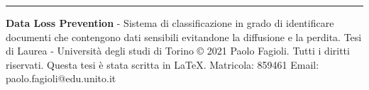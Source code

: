 
    \vspace*{\fill}
    \noindent\rule{\textwidth}{0.4pt}
    \thispagestyle{empty}
    \textbf{Data Loss Prevention} - Sistema di classificazione in grado di identificare documenti che contengono dati sensibili evitandone la diffusione e la perdita.
    \newline
    \newline
    Tesi di Laurea - Università degli studi di Torino
    \newline
    © 2021 Paolo Fagioli. Tutti i diritti riservati.
    \newline
    \newline
    Questa tesi è stata scritta in \LaTeX.
    \newline
    \newline
    Matricola: 859461
    \newline
    \newline
    Email: paolo.fagioli@edu.unito.it
\pagebreak